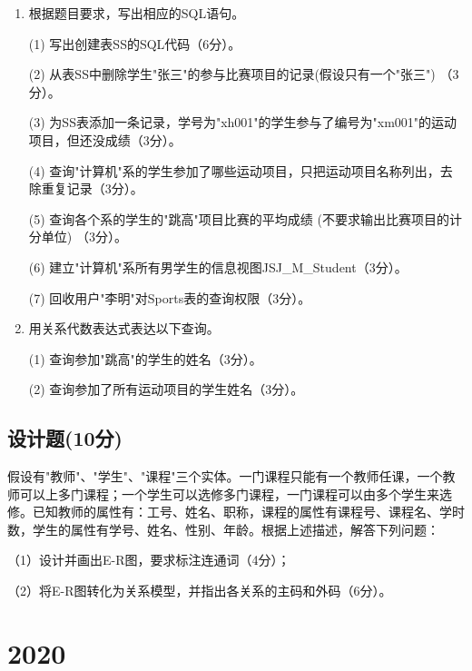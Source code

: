 \documentclass{article}
\begin{document}
\begin{enumerate}
\item 根据题目要求，写出相应的SQL语句。

(1) 写出创建表SS的SQL代码（6分）。

(2) 从表SS中删除学生"张三"的参与比赛项目的记录(假设只有一个"张三") （3分）。

(3) 为SS表添加一条记录，学号为"xh001"的学生参与了编号为"xm001"的运动项目，但还没成绩（3分）。

(4) 查询"计算机"系的学生参加了哪些运动项目，只把运动项目名称列出，去除重复记录（3分）。

(5) 查询各个系的学生的"跳高"项目比赛的平均成绩 (不要求输出比赛项目的计分单位) （3分）。

(6) 建立"计算机"系所有男学生的信息视图JSJ\_M\_Student（3分）。

(7) 回收用户"李明"对Sports表的查询权限（3分）。

\item 用关系代数表达式表达以下查询。

(1) 查询参加"跳高"的学生的姓名（3分）。

(2) 查询参加了所有运动项目的学生姓名（3分）。
\end{enumerate}

\subsection{设计题(10分)}

假设有"教师"、"学生"、"课程"三个实体。一门课程只能有一个教师任课，一个教师可以上多门课程；一个学生可以选修多门课程，一门课程可以由多个学生来选修。已知教师的属性有：工号、姓名、职称，课程的属性有课程号、课程名、学时数，学生的属性有学号、姓名、性别、年龄。根据上述描述，解答下列问题：

（1）设计并画出E-R图，要求标注连通词（4分）；

（2）将E-R图转化为关系模型，并指出各关系的主码和外码（6分）。

\section{2020}
\end{document}
